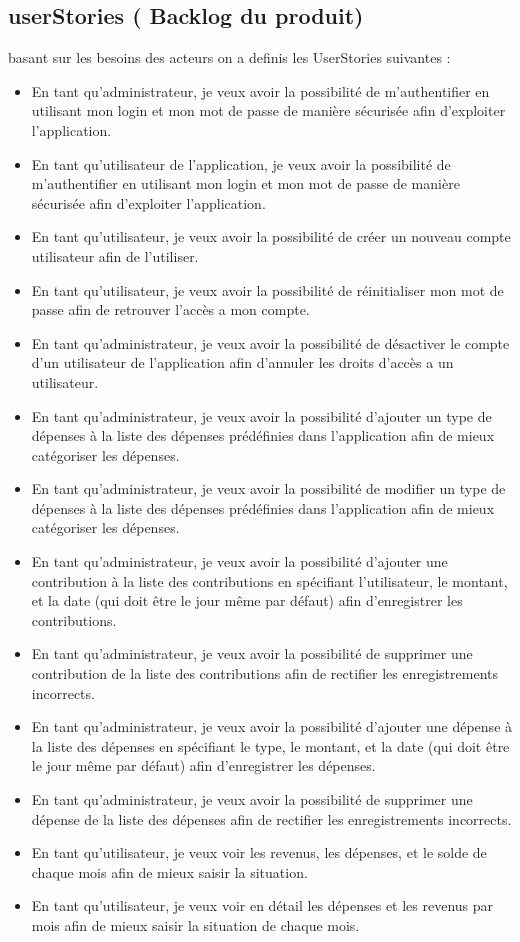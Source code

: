 \subsection{userStories ( Backlog du produit)}
    basant sur les besoins des acteurs on a definis les UserStories suivantes : 
    \begin{itemize}
        \item En tant qu'administrateur, je veux avoir la possibilité de m'authentifier en utilisant mon login et mon mot de passe de manière sécurisée afin d'exploiter l'application.
        \item En tant qu'utilisateur de l'application, je veux avoir la possibilité de m'authentifier en utilisant mon login et mon mot de passe de manière sécurisée afin d'exploiter l'application.    
        \item En tant qu'utilisateur, je veux avoir la possibilité de créer un nouveau compte utilisateur afin de l'utiliser.
        \item En tant qu'utilisateur, je veux avoir la possibilité de réinitialiser mon mot de passe afin de retrouver l'accès a mon compte.
        \item En tant qu'administrateur, je veux avoir la possibilité de désactiver le compte d'un utilisateur de l'application afin d'annuler les droits d'accès a un utilisateur.
        \item En tant qu'administrateur, je veux avoir la possibilité d'ajouter un type de dépenses à la liste des dépenses prédéfinies dans l'application afin de mieux catégoriser les dépenses.
        \item En tant qu'administrateur, je veux avoir la possibilité de modifier un type de dépenses à la liste des dépenses prédéfinies dans l'application afin de mieux catégoriser les dépenses.
        \item En tant qu'administrateur, je veux avoir la possibilité d'ajouter une contribution à la liste des contributions en spécifiant l'utilisateur, le montant, et la date (qui doit être le jour même par défaut) afin d'enregistrer les contributions.
        \item En tant qu'administrateur, je veux avoir la possibilité de supprimer une contribution de la liste des contributions afin de rectifier les enregistrements incorrects.
        \item En tant qu'administrateur, je veux avoir la possibilité d'ajouter une dépense à la liste des dépenses en spécifiant le type, le montant, et la date (qui doit être le jour même par défaut) afin d'enregistrer les dépenses.
        \item En tant qu'administrateur, je veux avoir la possibilité de supprimer une dépense de la liste des dépenses afin de rectifier les enregistrements incorrects.
        \item En tant qu'utilisateur, je veux voir les revenus, les dépenses, et le solde de chaque mois afin de mieux saisir la situation.
        \item En tant qu'utilisateur, je veux voir en détail les dépenses et les revenus par mois afin de mieux saisir la situation de chaque mois.
    \end{itemize} 
